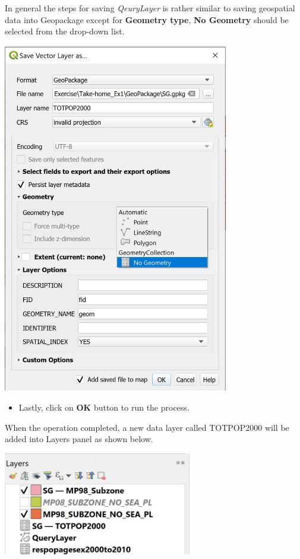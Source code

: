 \documentclass[
  letterpaper,
  DIV=11,
  numbers=noendperiod]{scrreprt}
\providecommand{\tightlist}{%
  \setlength{\itemsep}{0pt}\setlength{\parskip}{0pt}}\usepackage{longtable,booktabs,array}
\begin{document}
In general the steps for saving \emph{QeuryLayer} is rather similar to
saving geospatial data into Geopackage except for \textbf{Geometry
type}, \textbf{No Geometry} should be selected from the drop-down list.

\includegraphics[width=3.875in,height=\textheight]{./img03/image52.jpg}

\begin{itemize}
\tightlist
\item
  Lastly, click on \textbf{OK} button to run the process.
\end{itemize}

When the operation completed, a new data layer called TOTPOP2000 will be
added into Layers panel as shown below.

\includegraphics[width=3.23958in,height=\textheight]{./img03/image53.jpg}
\end{document}
